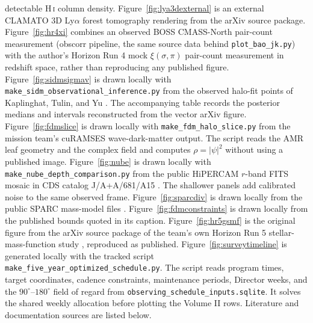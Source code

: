 detectable H\,\textsc{i} column density. Figure~\ref{fig:lya3dexternal} is an external CLAMATO 3D Ly$\alpha$ forest tomography rendering from the arXiv source package. Figure~\ref{fig:hr4xi} combines an observed BOSS CMASS-North pair-count measurement (obscorr pipeline, the same source data behind \texttt{plot\_bao\_jk.py}) with the author's Horizon Run 4 mock $\xi(\sigma,\pi)$ pair-count measurement in redshift space, rather than reproducing any published figure. Figure~\ref{fig:sidmsigmav} is drawn locally with \texttt{make\_sidm\_observational\_inference.py} from the observed halo-fit points of Kaplinghat, Tulin, and Yu \cite{kaplinghat2016}. The accompanying table records the posterior medians and intervals reconstructed from the vector arXiv figure. Figure~\ref{fig:fdmslice} is drawn locally with \texttt{make\_fdm\_halo\_slice.py} from the mission team's cuRAMSES wave-dark-matter output. The script reads the AMR leaf geometry and the complex field and computes $\rho=|\psi|^2$ without using a published image. Figure~\ref{fig:nube} is drawn locally with \texttt{make\_nube\_depth\_comparison.py} from the public HiPERCAM $r$-band FITS mosaic in CDS catalog J/A+A/681/A15 \cite{montes2024nube}. The shallower panels add calibrated noise to the same observed frame. Figure~\ref{fig:sparcdiv} is drawn locally from the public SPARC mass-model files \cite{lelli2016}. Figure~\ref{fig:fdmconstraints} is drawn locally from the published bounds quoted in its caption. Figure~\ref{fig:hr5gsmf} is the original figure from the arXiv source package of the team's own Horizon Run 5 stellar-mass-function study \cite{kim2023gsmf}, reproduced as published. Figure~\ref{fig:surveytimeline} is generated locally with the tracked script \texttt{make\_five\_year\_optimized\_schedule.py}. The script reads program times, target coordinates, cadence constraints, maintenance periods, Director weeks, and the $90^\circ$--$180^\circ$ field of regard from \texttt{observing\_schedule\_inputs.sqlite}. It solves the shared weekly allocation before plotting the Volume II rows. Literature and documentation sources are listed below.

